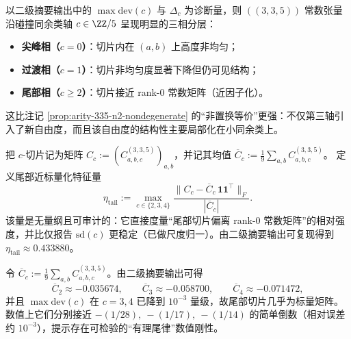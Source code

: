 \begin{remark}[三相分层：$c=0$ 的结构尖峰、$c=1$ 的过渡与 $c\ge 2$ 的近因子化尾部]\label{cor:arity-335-phase-stratification}
以二级摘要输出中的 $\max\mathrm{dev}(c)$ 与 $\Delta_c$ 为诊断量，则 \(((3,3,5))\) 常数张量沿碰撞同余类轴 $c\in\ZZ/5$ 呈现明显的三相分层：
\begin{itemize}
  \item \textbf{尖峰相（$c=0$）}：切片内在 $(a,b)$ 上高度非均匀；
  \item \textbf{过渡相（$c=1$）}：切片非均匀度显著下降但仍可见结构；
  \item \textbf{尾部相（$c\ge 2$）}：切片接近 rank-$0$ 常数矩阵（近因子化）。
\end{itemize}
这比注记 \ref{prop:arity-335-n2-nondegenerate} 的“非置换等价”更强：不仅第三轴引入了新自由度，而且该自由度的结构性主要局部化在小同余类上。
\end{remark}

\begin{remark}\label{rem:arity-335-eta-tail}
把 $c$-切片记为矩阵 \(C_c:=(C^{(3,3,5)}_{a,b,c})_{a,b}\)，并记其均值 \(\overline C_c:=\frac19\sum_{a,b}C^{(3,3,5)}_{a,b,c}\)。
定义尾部近标量化特征量
$$
\eta_{\mathrm{tail}}
:=\max_{c\in\{2,3,4\}}
\frac{\|C_c-\overline C_c\,\mathbf{1}\mathbf{1}^{\top}\|_F}{|\overline C_c|}.
$$
该量是无量纲且可审计的：它直接度量“尾部切片偏离 rank-$0$ 常数矩阵”的相对强度，并比仅报告 $\mathrm{sd}(c)$ 更稳定（已做尺度归一）。由二级摘要输出可复现得到 \(\eta_{\mathrm{tail}}\approx 0.433880\)。
\end{remark}

\begin{remark}[尾部近标量化与有理尾律迹象]\label{rem:arity-335-rational-tail}
令 $\overline C_c:=\frac19\sum_{a,b}C^{(3,3,5)}_{a,b,c}$。由二级摘要输出可得
\[
\overline C_2\approx -0.035674,\qquad
\overline C_3\approx -0.058700,\qquad
\overline C_4\approx -0.071472,
\]
并且 $\max\mathrm{dev}(c)$ 在 $c=3,4$ 已降到 $10^{-3}$ 量级，故尾部切片几乎为标量矩阵。数值上它们分别接近
\(
-(1/28),\ -(1/17),\ -(1/14)
\)
的简单倒数（相对误差约 $10^{-3}$），提示存在可检验的“有理尾律”数值刚性。
\end{remark}

